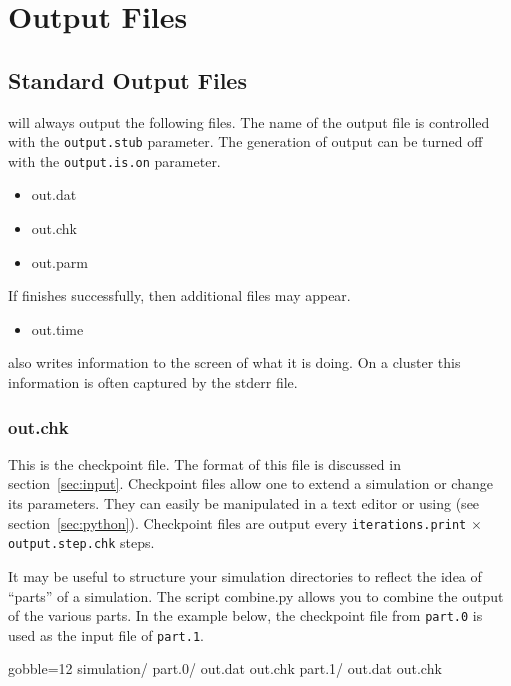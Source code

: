 \newpage
\section{Output Files}
\label{sec:output}

\subsection{Standard Output Files}
    \Langmuir will always output the following files.
    The name of the output file is controlled with the \texttt{output.stub}
        parameter.
    The generation of output can be turned off with the \texttt{output.is.on}
        parameter.
    \begin{itemize}
        \item out.dat
        \item out.chk
        \item out.parm
    \end{itemize}
    If \Langmuir finishes successfully, then additional files may appear.
    \begin{itemize}
        \item out.time
    \end{itemize}
    \Langmuir also writes information to the screen of what it is doing.
    On a cluster this information is often captured by the stderr file.

    \subsubsection{out.chk}
        This is the checkpoint file.
        The format of this file is discussed in section~\ref{sec:input}.
        Checkpoint files allow one to extend a simulation or change its
            parameters.
        They can easily be manipulated in a text editor or using \LangmuirPython
            (see section~\ref{sec:python}).
        Checkpoint files are output every \texttt{iterations.print} $\times$
            \texttt{output.step.chk} steps.
        
        It may be useful to structure your simulation directories to reflect
            the idea of ``parts'' of a simulation.
        The \LangmuirPython script combine.py allows you to combine the output
            of the various parts.
        In the example below, the checkpoint file from \texttt{part.0} is used
            as the input file of \texttt{part.1}.
        \begin{bashcode*}{gobble=12}
            simulation/
                part.0/
                    out.dat
                    out.chk
                part.1/
                    out.dat
                    out.chk
        \end{bashcode*}

